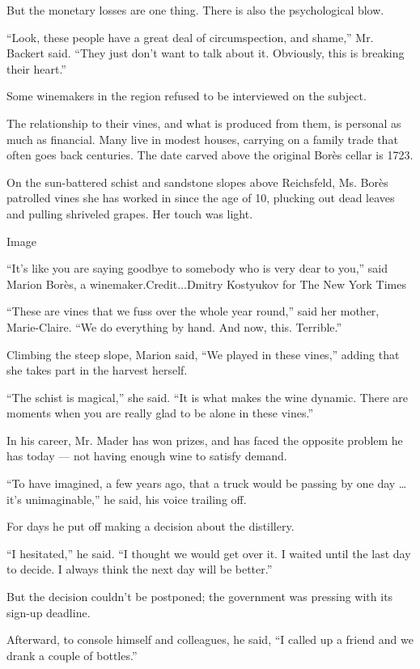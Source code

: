 But the monetary losses are one thing. There is also the psychological
blow.

``Look, these people have a great deal of circumspection, and shame,''
Mr. Backert said. ``They just don't want to talk about it. Obviously,
this is breaking their heart.''

Some winemakers in the region refused to be interviewed on the subject.

The relationship to their vines, and what is produced from them, is
personal as much as financial. Many live in modest houses, carrying on a
family trade that often goes back centuries. The date carved above the
original Borès cellar is 1723.

On the sun-battered schist and sandstone slopes above Reichsfeld, Ms.
Borès patrolled vines she has worked in since the age of 10, plucking
out dead leaves and pulling shriveled grapes. Her touch was light.

Image

``It's like you are saying goodbye to somebody who is very dear to
you,'' said Marion Borès, a winemaker.Credit...Dmitry Kostyukov for The
New York Times

``These are vines that we fuss over the whole year round,'' said her
mother, Marie-Claire. ``We do everything by hand. And now, this.
Terrible.''

Climbing the steep slope, Marion said, ``We played in these vines,''
adding that she takes part in the harvest herself.

``The schist is magical,'' she said. ``It is what makes the wine
dynamic. There are moments when you are really glad to be alone in these
vines.''

In his career, Mr. Mader has won prizes, and has faced the opposite
problem he has today --- not having enough wine to satisfy demand.

``To have imagined, a few years ago, that a truck would be passing by
one day \ldots{} it's unimaginable,'' he said, his voice trailing off.

For days he put off making a decision about the distillery.

``I hesitated,'' he said. ``I thought we would get over it. I waited
until the last day to decide. I always think the next day will be
better.''

But the decision couldn't be postponed; the government was pressing with
its sign-up deadline.

Afterward, to console himself and colleagues, he said, ``I called up a
friend and we drank a couple of bottles.''

